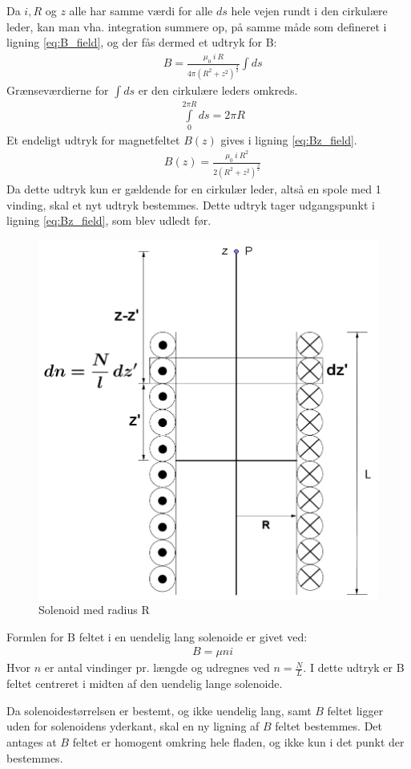 Da $i, R$ og $z$ alle har samme værdi for alle $ds$ hele vejen rundt i den cirkulære leder, kan man vha. integration summere op, på samme måde som defineret i ligning \ref{eq:B_field}, og der fås dermed et udtryk for B:
\begin{align}
&B=\frac{\mu_0 \: i \: R}{4\pi(R^2+z^2)^\frac{3}{2}}\int ds
\end{align}
Grænseværdierne for $\int ds$ er den cirkulære leders omkreds.
\begin{align}
&\int\limits_{0}^{2\pi R} ds = 2\pi R
\end{align}
Et endeligt udtryk for magnetfeltet $B(z)$ gives i ligning \ref{eq:Bz_field}.
\begin{align}
	&B(z)=\frac{\mu_0 \: i \: R^2}{2(R^2+z^2)^\frac{3}{2}} \label{eq:Bz_field}
\end{align}
Da dette udtryk kun er gældende for en cirkulær leder, altså en spole med 1 vinding, skal et nyt udtryk bestemmes. Dette udtryk tager udgangspunkt i ligning \ref{eq:Bz_field}, som blev udledt før.
\begin{figure}[h!]
	\centering
	\includegraphics[width=.7\textwidth]{billeder/B_felt2.png}
	\caption{Solenoid med radius R}
	\label{fig:spole_fig2}
\end{figure}
Formlen for B feltet i en uendelig lang solenoide er givet ved:
\begin{align}
	&B=\mu ni
\end{align}
Hvor $n$ er antal vindinger pr. længde og udregnes ved $n=\frac{N}{L}$.
I dette udtryk er B feltet centreret i midten af den uendelig lange solenoide.

Da solenoidestørrelsen er bestemt, og ikke uendelig lang, samt $B$ feltet ligger uden for solenoidens yderkant, skal en ny ligning af $B$ feltet bestemmes.
Det antages at $B$ feltet er homogent omkring hele fladen, og ikke kun i det punkt der bestemmes.


